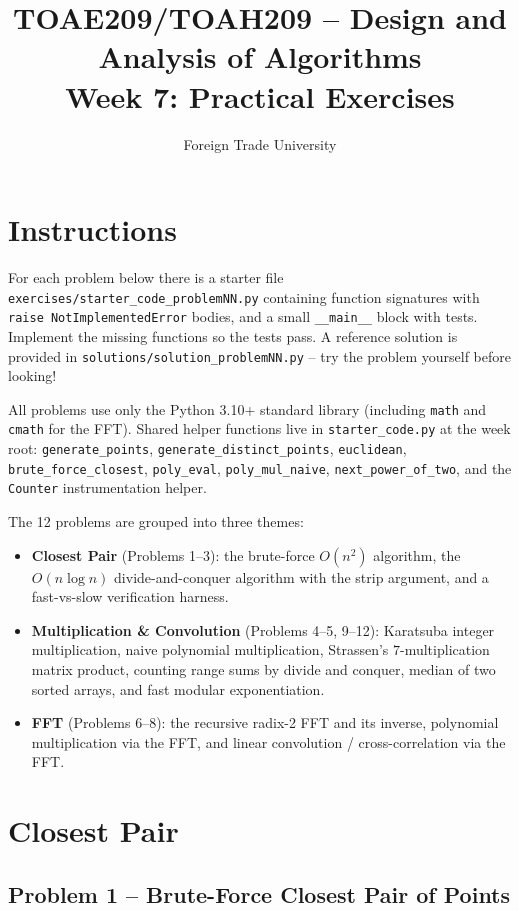 \documentclass[11pt]{article}
\title{TOAE209/TOAH209 -- Design and Analysis of Algorithms\\[4pt]
\large Week 7: Practical Exercises}
\author{Foreign Trade University}
\date{}
\begin{document}
\maketitle

\section*{Instructions}

For each problem below there is a starter file
\texttt{exercises/starter\_code\_problemNN.py} containing function signatures with
\texttt{raise NotImplementedError} bodies, and a small \texttt{\_\_main\_\_} block with
tests. Implement the missing functions so the tests pass. A reference solution is provided in
\texttt{solutions/solution\_problemNN.py} -- try the problem yourself before looking!

All problems use only the Python 3.10+ standard library (including \texttt{math} and
\texttt{cmath} for the FFT). Shared helper functions live in \texttt{starter\_code.py} at the
week root: \texttt{generate\_points}, \texttt{generate\_distinct\_points}, \texttt{euclidean},
\texttt{brute\_force\_closest}, \texttt{poly\_eval}, \texttt{poly\_mul\_naive},
\texttt{next\_power\_of\_two}, and the \texttt{Counter} instrumentation helper.

The 12 problems are grouped into three themes:
\begin{itemize}
    \item \textbf{Closest Pair} (Problems 1--3): the brute-force $O(n^2)$ algorithm, the
    $O(n \log n)$ divide-and-conquer algorithm with the strip argument, and a fast-vs-slow
    verification harness.
    \item \textbf{Multiplication \& Convolution} (Problems 4--5, 9--12): Karatsuba integer
    multiplication, naive polynomial multiplication, Strassen's $7$-multiplication matrix
    product, counting range sums by divide and conquer, median of two sorted arrays, and fast
    modular exponentiation.
    \item \textbf{FFT} (Problems 6--8): the recursive radix-2 FFT and its inverse,
    polynomial multiplication via the FFT, and linear convolution / cross-correlation via the
    FFT.
\end{itemize}

\newpage
\section{Closest Pair}

\subsection*{Problem 1 -- Brute-Force Closest Pair of Points}
\end{document}
